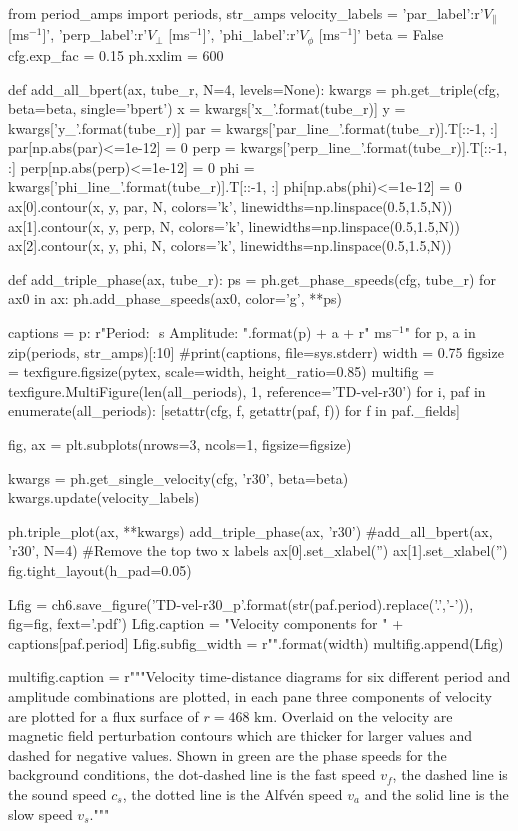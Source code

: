 \begin{pycode}[chapter6]

from period_amps import periods, str_amps
velocity_labels = {'par_label':r'$ V_\parallel$ [ms$^{-1}$]', 
                   'perp_label':r'$ V_\perp$ [ms$^{-1}$]',
                   'phi_label':r'$ V_\phi$ [ms$^{-1}$]'}
beta = False
cfg.exp_fac = 0.15
ph.xxlim = 600

def add_all_bpert(ax, tube_r, N=4, levels=None):
    kwargs = ph.get_triple(cfg, beta=beta, single='bpert')
    x = kwargs['x_{}'.format(tube_r)]
    y = kwargs['y_{}'.format(tube_r)]
    par = kwargs['par_line_{}'.format(tube_r)].T[::-1, :]
    par[np.abs(par)<=1e-12] = 0
    perp = kwargs['perp_line_{}'.format(tube_r)].T[::-1, :]
    perp[np.abs(perp)<=1e-12] = 0
    phi = kwargs['phi_line_{}'.format(tube_r)].T[::-1, :]
    phi[np.abs(phi)<=1e-12] = 0
    ax[0].contour(x, y, par, N, colors='k', linewidths=np.linspace(0.5,1.5,N))
    ax[1].contour(x, y, perp, N, colors='k', linewidths=np.linspace(0.5,1.5,N))
    ax[2].contour(x, y, phi, N, colors='k', linewidths=np.linspace(0.5,1.5,N))	                   

def add_triple_phase(ax, tube_r):
    ps = ph.get_phase_speeds(cfg, tube_r)
    for ax0 in ax:
        ph.add_phase_speeds(ax0, color='g', **ps)

captions = {p: r"Period: ${}$ s Amplitude: ".format(p) + a + r" ms$^{{-1}}$" for p, a in zip(periods, str_amps)[:10]}
#print(captions, file=sys.stderr)
width = 0.75
figsize = texfigure.figsize(pytex, scale=width, height_ratio=0.85)
multifig = texfigure.MultiFigure(len(all_periods), 1, reference='TD-vel-r30')
for i, paf in enumerate(all_periods):
    [setattr(cfg, f, getattr(paf, f)) for f in paf._fields]

    fig, ax = plt.subplots(nrows=3, ncols=1, figsize=figsize)
    
    kwargs = ph.get_single_velocity(cfg, 'r30', beta=beta)
    kwargs.update(velocity_labels)
    
    ph.triple_plot(ax, **kwargs)
    add_triple_phase(ax, 'r30')
    #add_all_bpert(ax, 'r30', N=4)
    #Remove the top two x labels
    ax[0].set_xlabel('')
    ax[1].set_xlabel('')
    fig.tight_layout(h_pad=0.05)
    
    Lfig = ch6.save_figure('TD-vel-r30_p{}'.format(str(paf.period).replace('.','-')), fig=fig, fext='.pdf')
    Lfig.caption = "Velocity components for " + captions[paf.period]
    Lfig.subfig_width = r"{}\columnwidth".format(width)
    multifig.append(Lfig)

multifig.caption = r"""Velocity time-distance diagrams for six different period and amplitude combinations are plotted, in each pane three components of velocity are plotted for a flux surface of $r=468$ km. Overlaid on the velocity are magnetic field perturbation contours which are thicker for larger values and dashed for negative values. Shown in green are the phase speeds for the background conditions, the dot-dashed line is the fast speed $v_f$, the dashed line is the sound speed $c_s$, the dotted line is the Alfv\'en speed $v_a$ and the solid line is the slow speed $v_s$."""
\end{pycode}

